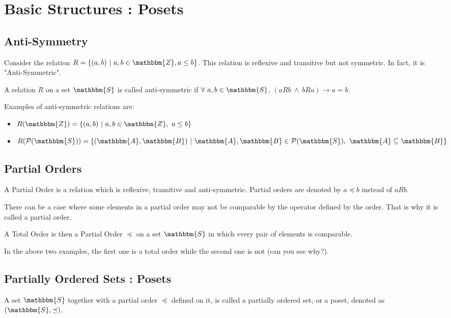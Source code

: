 \documentclass[14pt]{extarticle}
\newcommand{\impl}{\xrightarrow{}}
\newcommand{\A}{\mathbbm{A}}
\newcommand{\B}{\mathbbm{B}}
\newcommand{\Z}{\mathbbm{Z}}
\newcommand{\Sset}{\mathbbm{S}}
\newcommand{\powerset}{\mathcal{P}}
\newcommand{\pordereq}{\preceq}
\begin{document}
\newpage

\section{Basic Structures : Posets}

\subsection{Anti-Symmetry}

Consider the relation $R = \{ (a, b) \ | \ a, b \in \Z, a \leq b \}$. This relation is reflexive and transitive but not symmetric. In fact, it is "Anti-Symmetric".

A relation $R$ on a set $\Sset$ is called anti-symmetric if $\forall \ a, b \in \Sset$, $(aRb \ \land \ bRa) \impl a = b $.

Examples of anti-symmetric relations are:

\begin{itemize}
    \item $R(\Z) = \{(a, b) \ | \ a, b \in \Z, \ a \leq b\}$
    \item $R(\powerset(\Sset)) = \{(\A, \B) \ | \ \A, \B \in \powerset(\Sset), \ \A \subseteq \B\}$
\end{itemize}

\subsection{Partial Orders}

A Partial Order is a relation which is reflexive, transitive and anti-symmetric. Partial orders are denoted by $a \pordereq b$ instead of $aRb$. 

There can be a case where some elements in a partial order may not be comparable by the operator defined by the order. That is why it is called a partial order.

A Total Order is then a Partial Order $\pordereq$ on a set $\Sset$ in which every pair of elements is comparable.

In the above two examples, the first one is a total order while the second one is not (can you see why?).

\newpage

\subsection{Partially Ordered Sets : Posets}

A set $\Sset$ together with a partial order $\pordereq$ defined on it, is called a partially ordered set, or a poset, denoted as $(\Sset, \pordereq)$.
\end{document}
